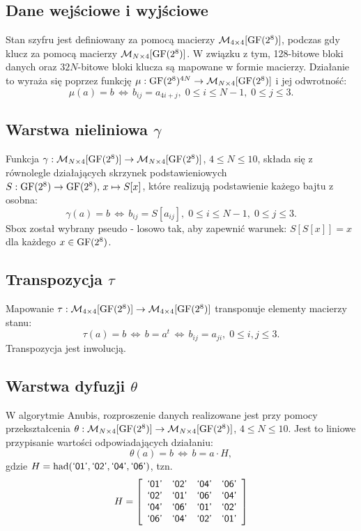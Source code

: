 \subsection{Dane wejściowe i wyjściowe}
Stan szyfru jest definiowany za pomocą macierzy $\mathcal{M}_{4 \times 4}[\mathrm{GF}(2^8)]$, podczas gdy klucz za pomocą macierzy $\mathcal{M}_{N \times 4}[\mathrm{GF}(2^8)]$. W związku z tym, 128-bitowe bloki danych oraz $32N$-bitowe bloki klucza są mapowane w formie macierzy. Działanie to wyraża się poprzez funkcję 
$\mu: \mathrm{GF}(2^8)^{4N} \rightarrow \mathcal{M}_{N \times 4}[\mathrm{GF}(2^8)]$ i jej odwrotność:
\[
\mu(a) = b \,\Leftrightarrow\, b_{ij} = a_{4i + j}, \; 0
\leqslant i \leqslant N-1, \; 0 \leqslant j \leqslant 3.
\]

\subsection{Warstwa nieliniowa $\gamma$}
Funkcja $\gamma: \mathcal{M}_{N \times 4}[\mathrm{GF}(2^8)] \rightarrow \mathcal{M}_{N \times 4}[\mathrm{GF}(2^8)]$,
$4 \leqslant N \leqslant 10$, składa się z równolegle działających skrzynek podstawieniowych $S: \mathrm{GF}(2^8) \rightarrow
\mathrm{GF}(2^8), \, x \mapsto S[x]$, które realizują podstawienie każego bajtu z osobna:
\[
\gamma(a) = b \,\Leftrightarrow\, b_{ij} = S[a_{ij}], \; 0
\leqslant i \leqslant N-1, \; 0 \leqslant j \leqslant 3.
\]
Sbox został wybrany pseudo - losowo tak, aby zapewnić warunek:
$S[S[x]] = x$ dla każdego $x \in \mathrm{GF}(2^8)$.

\subsection{Transpozycja $\tau$}
Mapowanie $\tau: \mathcal{M}_{4 \times 4}[\mathrm{GF}(2^8)] \rightarrow \mathcal{M}_{4 \times 4}[\mathrm{GF}(2^8)]$
transponuje elementy macierzy stanu:
\[
\tau(a) = b \,\Leftrightarrow\, b = a^t \,\Leftrightarrow\, b_{ij}
= a_{ji}, \; 0 \leqslant i, j \leqslant 3.
\]
Transpozycja jest inwolucją.

\subsection{Warstwa dyfuzji $\theta$}

W algorytmie Anubis, rozproszenie danych realizowane jest przy pomocy przekształcenia $\theta: \mathcal{M}_{N \times 4}[\mathrm{GF}(2^8)] \rightarrow
\mathcal{M}_{N \times 4}[\mathrm{GF}(2^8)]$, $4 \leqslant N \leqslant 10$. Jest to liniowe przypisanie wartości odpowiadających działaniu:
\[
\theta(a) = b \,\Leftrightarrow\, b = a \cdot H,
\]
gdzie $H = \mathrm{had}(\textsf{`01'}, \textsf{`02'}, \textsf{`04'},\textsf{`06'})$, tzn.
\[
H = \left[\begin{array}{cccc} %
\gf{01} & \gf{02} & \gf{04} & \gf{06}\\
\gf{02} & \gf{01} & \gf{06} & \gf{04}\\
\gf{04} & \gf{06} & \gf{01} & \gf{02}\\
\gf{06} & \gf{04} & \gf{02} & \gf{01}
\end{array}\right]
\]

